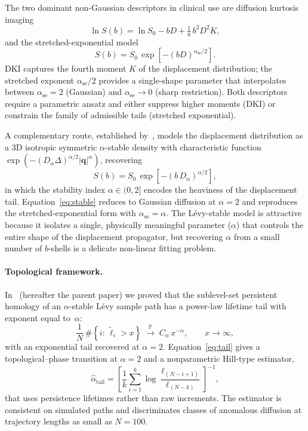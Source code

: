 \documentclass[11pt,letterpaper]{article}
\newcommand{\Prob}{\mathbb{P}}
\newcommand{\stab}{\alpha}
\newcommand{\life}{\ell}
\begin{document}
The two dominant non-Gaussian descriptors in clinical use are diffusion
kurtosis imaging~\citep{jensen2005dki}
\begin{equation}
\ln S(b) = \ln S_0 - bD + \tfrac{1}{6}\, b^2 D^2 K,
\label{eq:dki}
\end{equation}
and the stretched-exponential model~\citep{bennett2003characterization}
\begin{equation}
S(b) = S_0 \, \exp\!\left[- (bD)^{\stab_{\mathrm{se}}/2}\right].
\label{eq:stretched}
\end{equation}
DKI captures the fourth moment $K$ of the displacement distribution;
the stretched exponent $\stab_{\mathrm{se}}/2$ provides a single-shape
parameter that interpolates between $\stab_{\mathrm{se}}=2$ (Gaussian)
and $\stab_{\mathrm{se}}\to 0$ (sharp restriction). Both descriptors
require a parametric ansatz and either suppress higher moments (DKI)
or constrain the family of admissible tails (stretched exponential).

A complementary route, established by~\citet{magin2008anomalous}, models
the displacement distribution as a 3D isotropic symmetric $\stab$-stable
density with characteristic function $\exp(-(D_\stab \Delta)^{\stab/2}
|\mathbf{q}|^{\stab})$, recovering
\begin{equation}
S(b) = S_0\,\exp\!\left[- (b\,D_\stab)^{\stab/2}\right],
\label{eq:stable}
\end{equation}
in which the stability index $\stab \in (0,2]$ encodes the heaviness of
the displacement tail. Equation~\eqref{eq:stable} reduces to Gaussian
diffusion at $\stab=2$ and reproduces the stretched-exponential form
with $\stab_{\mathrm{se}}=\stab$. The L\'evy-stable model is attractive
because it isolates a single, physically meaningful parameter
($\stab$) that controls the entire shape of the displacement
propagator, but recovering $\stab$ from a small number of $b$-shells is
a delicate non-linear fitting problem.

\paragraph*{Topological framework.}
In~\citet{warioba2026levy} (hereafter the parent paper) we proved that
the sublevel-set persistent homology of an $\stab$-stable L\'evy sample
path has a power-law lifetime tail with exponent equal to~$\stab$:
\begin{equation}
\frac{1}{N}\,\#\!\left\{ i:\, \widetilde{\life}_i > x \right\}
\;\xrightarrow{\;\Prob\;}\; C_\stab\, x^{-\stab},
\qquad x\to\infty,
\label{eq:tail}
\end{equation}
with an exponential tail recovered at $\stab=2$. Equation~\eqref{eq:tail}
gives a topological--phase transition at $\stab=2$ and a nonparametric
Hill-type estimator,
\begin{equation}
\widehat{\stab}_{\mathrm{tail}} = \left[
\frac{1}{k}\sum_{i=1}^{k}
\log \frac{\life_{(N-i+1)}}{\life_{(N-k)}}
\right]^{-1},
\label{eq:hill}
\end{equation}
that uses persistence lifetimes rather than raw increments. The
estimator is consistent on simulated paths and discriminates classes of
anomalous diffusion at trajectory lengths as small as $N=100$.
\end{document}
